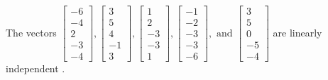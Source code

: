 \begin{exercise}
\begin{exerciseStatement}
  \end{exerciseStatement}
  \begin{exerciseAnswer}
   The vectors \(\left[\begin{array}{r}
-6 \\
-4 \\
2 \\
-3 \\
-4
\end{array}\right] , \left[\begin{array}{r}
3 \\
5 \\
4 \\
-1 \\
3
\end{array}\right] , \left[\begin{array}{r}
1 \\
2 \\
-3 \\
-3 \\
1
\end{array}\right] , \left[\begin{array}{r}
-1 \\
-2 \\
-3 \\
-3 \\
-6
\end{array}\right] , \text{ and } \left[\begin{array}{r}
3 \\
5 \\
0 \\
-5 \\
-4
\end{array}\right]\) are 
  	 linearly independent  .
  


  \end{exerciseAnswer}
\end{exercise}